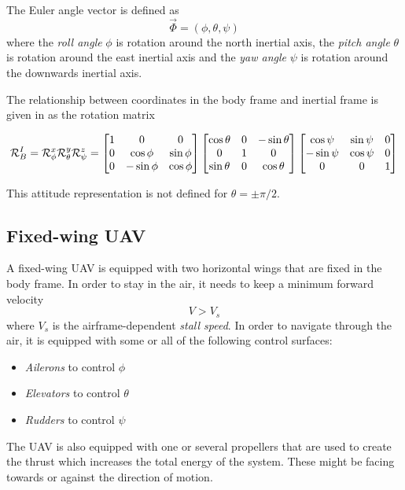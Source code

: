 \begin{definition}
The Euler angle vector is defined as
\begin{equation}
    \vec{\Phi}=(\phi, \theta, \psi)
\end{equation}
where the \textit{roll angle} $\phi$ is rotation around the north inertial axis, 
the \textit{pitch angle} $\theta$ is rotation around the east inertial axis and
the \textit{yaw angle} $\psi$ is rotation around the downwards inertial axis.

The relationship between coordinates in the body frame and inertial frame is given
in \cite{sensor_fusion} as the rotation matrix 

\begin{equation}\label{eq:r_i_b}
\mathcal{R}^I_B = \mathcal{R}^x_\phi\mathcal{R}^y_\theta\mathcal{R}^z_\psi\\
=
\begin{bmatrix}
    1 & 0 & 0 \\
    0 & \cos\phi & \sin\phi \\
    0 & -\sin\phi & \cos\phi
\end{bmatrix}
\begin{bmatrix}
    \cos\theta & 0 & -\sin\theta \\
    0 & 1 & 0 \\
    \sin\theta & 0 & \cos\theta
\end{bmatrix}      
\begin{bmatrix}
    \cos\psi & \sin\psi & 0 \\
    -\sin\psi & \cos\psi & 0 \\
    0 & 0 & 1
\end{bmatrix}
\end{equation}  
\end{definition}

This attitude representation is not defined for $\theta=\pm\pi/2$.

\subsection{Fixed-wing UAV}
A fixed-wing UAV is equipped with two horizontal wings that are fixed in the body frame.
In order to stay in the air, it needs to keep a minimum forward velocity
\begin{equation}
    V > V_{s}
\end{equation}
where $V_s$ is the airframe-dependent \textit{stall speed}. In order to navigate through the
air, it is equipped with some or all of the following control surfaces:
\begin{itemize}
    \item \textit{Ailerons} to control $\phi$
    \item \textit{Elevators} to control $\theta$
    \item \textit{Rudders} to control $\psi$
\end{itemize}
The UAV is also equipped with one or several propellers that are used to create the thrust which
increases the total energy of the system. These might be facing towards or against the direction of motion.


